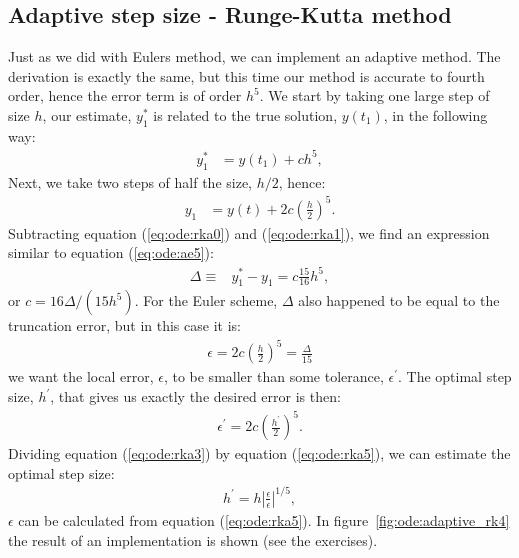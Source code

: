 \documentclass[graybox,sectrefs,envcountresetchap,open=right,final]{svmonodo}
\begin{document}
\subsection{Adaptive step size - Runge-Kutta method}
Just as we did with Eulers method, we can implement an adaptive method. The derivation is exactly the same, but this time our method is accurate to
fourth order, hence the error term is of order $h^5$. We start by taking one large step of size $h$, our estimate, $y_1^*$ is related to the true 
solution, $y(t_1)$, in the following way:
\begin{align}
y^*_1&=y(t_1)+ch^5,\label{eq:ode:rka0}
\end{align}
Next, we take two steps of half the size, $h/2$, hence:
\begin{align}
y_1&=y(t)+2c\left(\frac{h}{2}\right)^5.\label{eq:ode:rka1}
\end{align}
Subtracting equation (\ref{eq:ode:rka0}) and (\ref{eq:ode:rka1}), we find an expression similar to equation (\ref{eq:ode:ae5}):
\begin{align}
\Delta\equiv& y_1^*-y_1=c\frac{15}{16}h^5,\label{eq:ode:rka2}
\end{align}
or $c=16\Delta/(15h^5)$. For the Euler scheme, $\Delta$ also happened to be equal to the truncation error, but in this case it is:
\begin{align}
\epsilon=2c\left(\frac{h}{2}\right)^5=\frac{\Delta}{15}\label{eq:ode:rka5}
\end{align}
we want the local error, $\epsilon$, to be smaller than some tolerance, $\epsilon^\prime$.  
The optimal step size, $h^\prime$,  that gives us exactly the desired error is then:
\begin{align}
\epsilon^\prime=2c\left(\frac{{h^\prime}}{2}\right)^5.\label{eq:ode:rka3}
\end{align}
Dividing equation (\ref{eq:ode:rka3}) by equation (\ref{eq:ode:rka5}), we can estimate the optimal step size:
\begin{align}
h^\prime=h\left|\frac{\epsilon}{\epsilon}\right|^{1/5},\label{eq:ode:rka4}
\end{align}
$\epsilon$ can be calculated from equation (\ref{eq:ode:rka5}). In figure~\ref{fig:ode:adaptive_rk4} the result of an  implementation is shown (see the exercises). 
\end{document}
